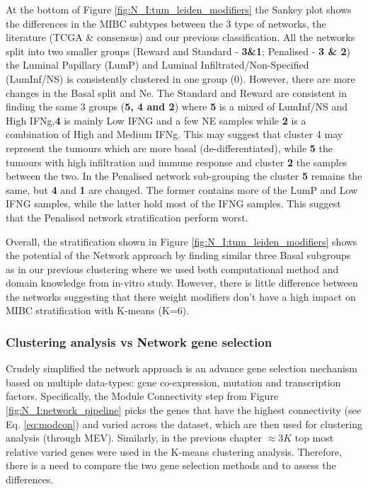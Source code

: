 At the bottom of Figure \ref{fig:N_I:tum_leiden_modifiers} the Sankey plot shows the differences in the MIBC subtypes between the 3 type of networks, the literature (TCGA \& consensus) and our previous classification. All the networks split into two smaller groups (Reward and Standard - \textbf{3\&1}; Penalised - \textbf{3 \& 2}) the Luminal Papillary (LumP) and Luminal Infiltrated/Non-Specified (LumInf/NS) is consistently clustered in one group (0). However, there are more changes in the Basal split and Ne. The Standard and Reward are consistent in finding the same 3 groups (\textbf{5, 4 and 2}) where\textbf{ 5} is a mixed of LumInf/NS and High IFNg,\textbf{4} is mainly Low IFNG and a few NE samples while \textbf{2} is a combination of High and Medium IFNg. This may suggest that cluster 4 may represent the tumours which are more basal (de-differentiated), while \textbf{5} the tumours with high infiltration and immune response and cluster \textbf{2} the samples between the two. In the Penalised network sub-grouping the cluster \textbf{5} remains the same, but \textbf{4} and \textbf{1} are changed. The former contains more of the LumP and Low IFNG samples, while the latter hold most of the IFNG samples. This suggest that the Penalised network stratification perform worst.

Overall, the stratification shown in Figure \ref{fig:N_I:tum_leiden_modifiers} shows the potential of the Network approach by finding similar three Basal subgroups as in our previous clustering where we used both computational method and domain knowledge from in-vitro study\citet{Baker2022-bj}. However, there is little difference between the networks suggesting that there weight modifiers don't have a high impact on MIBC stratification with K-means (K=6).

\subsubsection{Clustering analysis vs Network gene selection} \label{s:N_I:cs_vs_gene_sel}

Crudely simplified the network approach is an advance gene selection mechanism based on multiple data-types: gene co-expression, mutation and transcription factors. Specifically, the Module Connectivity step from Figure \ref{fig:N_I:network_pipeline} picks the genes that have the highest connectivity (see Eq. \ref{eq:modcon}) and varied across the dataset, which are then used for clustering analysis (through MEV). Similarly, in the previous chapter $\approx3K$ top most relative varied genes were used in the K-means clustering analysis. Therefore, there is a need to compare the two gene selection methods and to assess the differences.

